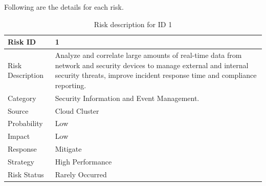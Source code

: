 \documentclass[oneside,a4paper,12pt]{book}
\begin{document}
Following are the details for each risk.
\begin{table}[H]
\centering
\begin{tabular}{p{1.09in} p{4.07in}}
\hline
\hline
\multicolumn{1}{p{1.09in}}{Risk ID} & 
\multicolumn{1}{p{4.07in}}{1} \\
\hline
\hline
\multicolumn{1}{p{1.09in}}{Risk Description} & 
\multicolumn{1}{p{4.07in}}{Analyze and correlate large amounts of real-time data from network and security devices to manage external and internal security threats, improve incident response time and compliance reporting.} \\
\hline

\multicolumn{1}{p{1.09in}}{Category} & 
\multicolumn{1}{p{4.07in}}{Security Information and Event Management.} \\
\hline

\multicolumn{1}{p{1.09in}}{Source} & 
\multicolumn{1}{p{4.07in}}{Cloud Cluster} \\
\hline

\multicolumn{1}{p{1.09in}}{Probability} & 
\multicolumn{1}{p{4.07in}}{Low} \\
\hline

\multicolumn{1}{p{1.09in}}{Impact} & 
\multicolumn{1}{p{4.07in}}{Low} \\
\hline

\multicolumn{1}{p{1.09in}}{Response} & 
\multicolumn{1}{p{4.07in}}{Mitigate} \\
\hline

\multicolumn{1}{p{1.09in}}{Strategy} & 
\multicolumn{1}{p{4.07in}}{High Performance} \\

\hline
\multicolumn{1}{p{1.09in}}{Risk Status} & 
\multicolumn{1}{p{4.07in}}{Rarely Occurred} \\
\hline
\hline
\end{tabular}
\caption{Risk description for ID 1}
\end{table}
\end{document}
